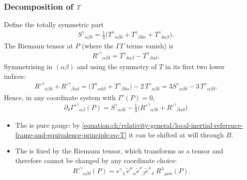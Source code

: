 \documentclass[letterpaper,10pt,english]{jupyterBook}
\begin{document}
\subsubsection{Decomposition of \protect\(T\protect\)}
\label{\detokenize{ch/relativity-general/local-inertial-reference-frame-and-equivalence-principle:decomposition-of-t}}
\sphinxAtStartPar
Define the totally symmetric part
\begin{equation*}
\begin{split}
S^\gamma{}_{\alpha\beta\delta}=\tfrac13\big(T^\gamma{}_{\alpha\beta\delta}+T^\gamma{}_{\beta\delta\alpha}+T^\gamma{}_{\delta\alpha\beta}\big).
\end{split}
\end{equation*}
\sphinxAtStartPar
The Riemann tensor at \(P\) (where the \(\Gamma\Gamma\) terms vanish) is
\begin{equation*}
\begin{split}
R'^\gamma{}_{\alpha\beta\delta}=T^\gamma{}_{\delta\alpha\beta}-T^\gamma{}_{\beta\alpha\delta}.
\end{split}
\end{equation*}
\sphinxAtStartPar
Symmetrising in \((\alpha\beta)\) and using the symmetry of \(T\) in its first two lower indices:
\begin{equation*}
\begin{split}
R'^\gamma{}_{\alpha\beta\delta}+R'^\gamma{}_{\beta\alpha\delta}
=\big(T^\gamma{}_{\alpha\delta\beta}+T^\gamma{}_{\beta\delta\alpha}\big)-2\,T^\gamma{}_{\alpha\beta\delta}
=3S^\gamma{}_{\alpha\beta\delta}-3\,T^\gamma{}_{\alpha\beta\delta}.
\end{split}
\end{equation*}
\sphinxAtStartPar
Hence, in any coordinate system with \(\Gamma'(P)=0\),
\begin{equation}\label{equation:ch/relativity-general/local-inertial-reference-frame-and-equivalence-principle:eq-decomp}
\begin{split}
\boxed{\,\partial_\delta\Gamma'^\gamma{}_{\alpha\beta}(P)=S^\gamma{}_{\alpha\beta\delta}-\tfrac13\big(R'^\gamma{}_{\alpha\beta\delta}+R'^\gamma{}_{\beta\alpha\delta}\big)\,}
\end{split}
\end{equation}\begin{itemize}
\item {} 
\sphinxAtStartPar
The  is pure gauge: by \eqref{equation:ch/relativity-general/local-inertial-reference-frame-and-equivalence-principle:eq-T} it can be shifted at will through \(B\).

\item {} 
\sphinxAtStartPar
The  is fixed by the Riemann tensor, which transforms as a tensor and therefore cannot be changed by any coordinate choice:
\begin{equation*}
\begin{split}
   R'^\gamma{}_{\alpha\beta\delta}(P)=e^\gamma{}_\lambda\,\tilde e^\mu{}_\alpha\tilde e^\nu{}_\beta\tilde e^\kappa{}_\delta\;R^\lambda{}_{\mu\nu\kappa}(P).
   \end{split}
\end{equation*}
\end{itemize}
\end{document}
